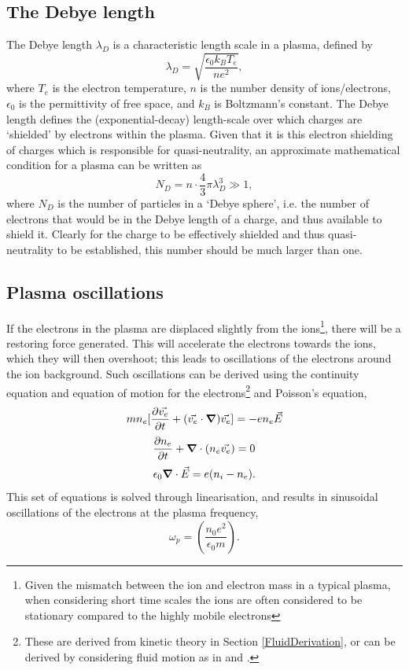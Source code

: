 \subsection{The Debye length}
The Debye length $\lambda_D$ is a characteristic length scale in a plasma, defined by
\begin{equation} \lambda_D = \sqrt{ \frac{\epsilon_0 k_B T_e}{n e^2}}, \end{equation}
where $T_e$ is the electron temperature, $n$ is the number density of ions/electrons, $\epsilon_0$ is the permittivity of free space, and $k_B$ is Boltzmann's constant. The Debye length defines the (exponential-decay) length-scale over which charges are `shielded' by electrons within the plasma. Given that it is this electron shielding of charges which is responsible for quasi-neutrality, an approximate mathematical condition for a plasma can be written as 
\begin{equation} N_D = n \cdot \frac{4}{3} \pi \lambda_D^3 \gg 1, \end{equation}
where $N_D$ is the number of particles in a `Debye sphere', i.e. the number of electrons that would be in the Debye length of a charge, and thus available to shield it. Clearly for the charge to be effectively shielded and thus quasi-neutrality to be established, this number should be much larger than one.

\subsection{Plasma oscillations} \label{PlasmaOscillations}
If the electrons in the plasma are displaced slightly from the ions\footnote{Given the mismatch between the ion and electron mass in a typical plasma, when considering short time scales the ions are often considered to be stationary compared to the highly mobile electrons}, there will be a restoring force generated. This will accelerate the electrons towards the ions, which they will then overshoot; this leads to oscillations of the electrons around the ion background. Such oscillations can be derived using the continuity equation and equation of motion for the electrons\footnote{These are derived from kinetic theory in Section \ref{FluidDerivation}, or can be derived by considering fluid motion as in \cite{Chen2015} and \cite{Piel2017}.} and Poisson's equation,
\begin{equation} m n_e [\frac{\partial\vec{v_e}}{\partial t} + (\vec{v_e} \cdot \grad)\vec{v_e}] = -e n_e \vec{E} \end{equation}
\begin{equation} \frac{\partial n_e}{\partial t} + \grad \cdot (n_e \vec{v_e}) = 0 \label{eqn: ElectronEoM} \end{equation}
\begin{equation} \epsilon_0 \grad \cdot \vec{E} = e(n_i - n_e). \end{equation}
This set of equations is solved through linearisation, and results in sinusoidal oscillations of the electrons at the plasma frequency, 
\begin{equation} \omega_p = \left( \frac{n_0 e^2}{\epsilon_0 m}\right). \label{eqn: PlasmaFrequency} \end{equation}

